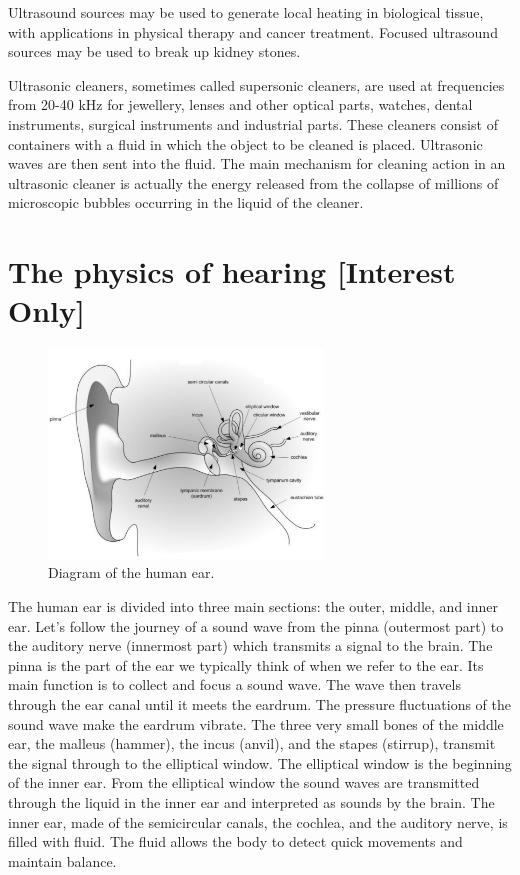 \label{m38800*id185154}Ultrasound sources may be used to generate local heating in biological tissue, with applications in physical therapy and cancer treatment. Focused ultrasound sources may be used to break up kidney stones.\par 
      \label{m38800*id185159}Ultrasonic cleaners, sometimes called supersonic cleaners, are used at frequencies from 20-40 kHz for jewellery, lenses and other optical parts, watches, dental instruments, surgical instruments and industrial parts.
These cleaners consist of containers with a fluid in which the object to be cleaned is placed. Ultrasonic waves are then sent into the fluid. The main mechanism for cleaning action in an ultrasonic cleaner is actually the energy released from the collapse of millions of microscopic bubbles occurring in the liquid of the cleaner.\par 
\label{m38800*notfhsst!!!underscore!!!id482}


\section*{The physics of hearing [Interest Only]}
            \nopagebreak
\begin{figure}[H]
\begin{center}
\includegraphics[width=0.65\textwidth]{HumanEar-GrayScale.pdf}
\end{center}
\caption{Diagram of the human ear. }
\label{Human Ear}
\end{figure}


      \label{m38800*id184052}The human ear is divided into three main sections: the outer, middle,
and inner ear. Let's follow the journey of a sound wave from the pinna (outermost part) to the auditory nerve (innermost part) which transmits a signal to the brain. The pinna is the part of the ear we typically think of when we refer to the ear. Its main
function is to collect and focus a sound wave. The wave
then travels through the ear canal until it meets the eardrum. The
pressure fluctuations of the sound wave make the eardrum vibrate.
The three very small bones of the middle ear, the malleus (hammer),
the incus (anvil), and the stapes (stirrup), transmit the signal through
to the elliptical window. The elliptical window is the beginning of the
inner ear. From the elliptical window the sound waves are transmitted through the liquid
in the inner ear and interpreted as sounds by the brain.
The inner ear, made of the semicircular canals, the cochlea,
and the auditory nerve, is filled with fluid. The fluid allows the body to
detect quick movements and maintain balance. 


